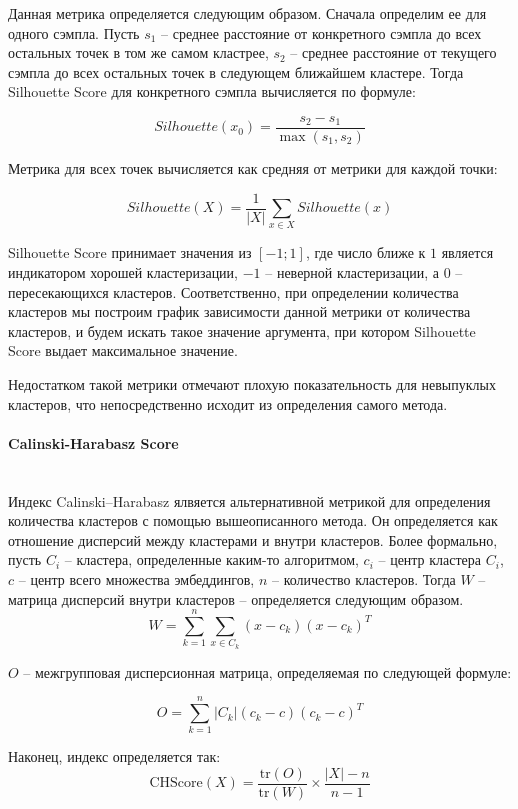 Данная метрика определяется следующим образом. Сначала определим ее для одного сэмпла. Пусть $s_1$ -- среднее расстояние от конкретного сэмпла до всех остальных точек в том же самом кластрее, $s_2$ -- среднее расстояние от текущего сэмпла до всех остальных точек в следующем ближайшем кластере. Тогда Silhouette Score для конкретного сэмпла вычисляется по формуле:

$$
    Silhouette(x_0) = \frac{s_2 - s_1}{\max(s_1, s_2)}
$$
\smallskip

Метрика для всех точек вычисляется как средняя от метрики для каждой точки:

$$
    Silhouette(X) = \frac{1}{|X|} \sum_{x \in X} Silhouette(x)
$$
\smallskip

Silhouette Score принимает значения из $[-1; 1]$, где число ближе к $1$ является индикатором хорошей кластеризации, $-1$ -- неверной кластеризации, а $0$ -- пересекающихся кластеров. Соответственно, при определении количества кластеров мы построим график зависимости данной метрики от количества кластеров, и будем искать такое значение аргумента, при котором Silhouette Score выдает максимальное значение.

Недостатком такой метрики отмечают плохую показательность для невыпуклых кластеров, что непосредственно исходит из определения самого метода.

\paragraph{Calinski-Harabasz Score}\mbox{} \\

Индекс Calinski–Harabasz ялвяется альтернативной метрикой для определения количества кластеров с помощью вышеописанного метода. Он определяется как отношение дисперсий между кластерами и внутри кластеров. Более формально, пусть $C_i$ -- кластера, определенные каким-то алгоритмом, $c_i$ -- центр кластера $C_i$, $c$ -- центр всего множества эмбеддингов, $n$ -- количество кластеров. Тогда $W$ -- матрица дисперсий внутри кластеров -- определяется следующим образом.
$$
W = \sum_{k = 1}^{n} \sum_{x \in C_k} (x - c_k)(x - c_k)^T
$$

\bigskip
\noindent
$O$ -- межгрупповая дисперсионная матрица, определяемая по следующей формуле:

$$
O = \sum_{k = 1}^n |C_k|(c_k - c)(c_k - c)^T
$$

\smallskip
\noindent

Наконец, индекс определяется так:
$$
\text{CHScore}(X) = \frac{\text{tr}(O)}{\text{tr}(W)} \times \frac{|X| - n}{n - 1}
$$

